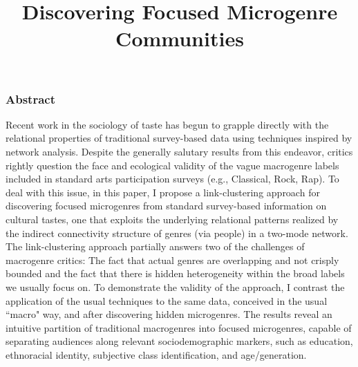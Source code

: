 \documentclass[a4paper,12pt]{extarticle}
\title{Discovering Focused Microgenre Communities}
\begin{document}
\maketitle
\subsubsection*{Abstract} 
Recent work in the sociology of taste has begun to grapple directly with the relational properties of traditional survey-based data using techniques inspired by network analysis. Despite the generally salutary results from this endeavor, critics rightly question the face and ecological validity of the vague macrogenre labels included in standard arts participation surveys (e.g., Classical, Rock, Rap). To deal with this issue, in this paper, I propose a link-clustering approach for discovering focused microgenres from standard survey-based information on cultural tastes, one that exploits the underlying relational patterns realized by the indirect connectivity structure of genres (via people) in a two-mode network. The link-clustering approach partially answers two of the challenges of macrogenre critics: The fact that actual genres are overlapping and not crisply bounded and the fact that there is hidden heterogeneity within the broad labels we usually focus on. To demonstrate the validity of the approach, I contrast the application of the usual techniques to the same data, conceived in the usual ``macro" way, and after discovering hidden microgenres. The results reveal an intuitive partition of traditional macrogenres into focused microgenres, capable of separating audiences along relevant sociodemographic markers, such as education, ethnoracial identity, subjective class identification, and age/generation. 
\newpage
\end{document}
